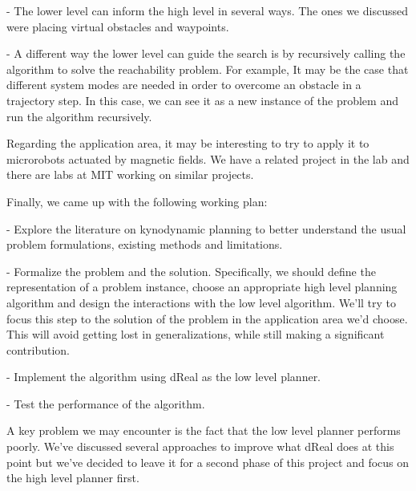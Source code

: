 \documentclass[12pt]{article}
\begin{document}
- The lower level can inform the high level in several ways. The ones we discussed were placing virtual obstacles and waypoints.

- A different way the lower level can guide the search is by recursively calling the algorithm to solve the reachability problem. For example, It may be the case that different system modes are needed in order to overcome an obstacle in a trajectory step. In this case, we can see it as a new instance of the problem and run the algorithm recursively.

Regarding the application area, it may be interesting to try to apply it to microrobots actuated by magnetic fields. We have a related project in the lab and there are labs at MIT working on similar projects.

Finally, we came up with the following working plan:

- Explore the literature on kynodynamic planning to better understand the usual problem formulations, existing methods and limitations.

- Formalize the problem and the solution. Specifically, we should define the representation of a problem instance, choose an appropriate high level planning algorithm and design the interactions with the low level algorithm. We'll try to focus this step to the solution of the problem in the application area we'd choose. This will avoid getting lost in generalizations, while still making a significant contribution.

- Implement the algorithm using dReal as the low level planner.

- Test the performance of the algorithm.

A key problem we may encounter is the fact that the low level planner performs poorly. We've discussed several approaches to improve what dReal does at this point but we've decided to leave it for a second phase of this project and focus on the high level planner first.
\fi
\end{document}
